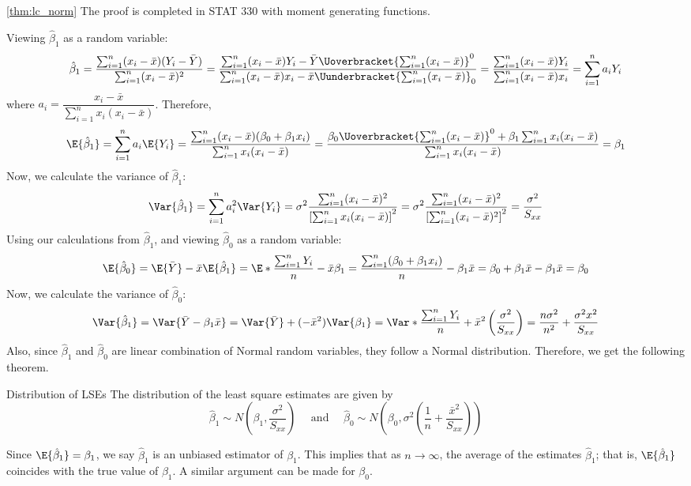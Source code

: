 \begin{Proof}{\ref{thm:lc_norm}}{}
    The proof is completed in STAT 330 with moment generating functions.
\end{Proof}
Viewing $ \hat{\beta}_1 $ as a random variable:
\[ \hat{\beta}_1=\frac{\sum_{i=1}^{n} (x_i-\bar{x})
        (Y_i-\bar{Y})}{
        \sum_{i=1}^{n} (x_i-\bar{x})^2
    }
    =
    \frac{\sum_{i=1}^{n} (x_i-\bar{x})Y_i-
        \bar{Y}\Uoverbracket{\sum_{i=1}^{n} (x_i-\bar{x})}^{0}}{
        \sum_{i=1}^{n} (x_i-\bar{x})x_i-\bar{x}
        \Uunderbracket{\sum_{i=1}^{n} (x_i-\bar{x})}_{0}
    }
    =
    \frac{\sum_{i=1}^{n} (x_i-\bar{x})Y_i}{
        \sum_{i=1}^{n} (x_i-\bar{x})x_i
    }=\sum_{i=1}^{n} a_i Y_i  \]
where $ a_i=\dfrac{x_i-\bar{x}}{\sum_{i=1}^{n} x_i(x_i-\bar{x})}  $.
Therefore,
\[
    \E{\hat{\beta}_1}
    = \sum_{i=1}^{n} a_i\E{Y_i}
    =\frac{\sum_{i=1}^{n}(x_i-\bar{x})(\beta_0+\beta_1x_i)}{
        \sum_{i=1}^{n} x_i(x_i-\bar{x})
    }
    =\frac{\beta_0 \Uoverbracket{\sum_{i=1}^{n}(x_i-\bar{x})}^{0}+
        \beta_1\sum_{i=1}^{n} x_i(x_i-\bar{x})}{
        \sum_{i=1}^{n} x_i(x_i-\bar{x})
    }
    =
    \beta_1
\]
Now, we calculate the variance of $ \hat{\beta}_1 $:
\[
    \Var{\hat{\beta}_1}
    =\sum_{i=1}^{n} a_i^2\Var{Y_i}
    =\sigma^2
    \frac{\sum_{i=1}^{n} (x_i-\bar{x})^2}{
        \left[ \sum_{i=1}^{n} x_i(x_i-\bar{x}) \right]^2
    }
    =\sigma^2 \frac{\sum_{i=1}^{n} (x_i-\bar{x})^2}{
        \left[ \sum_{i=1}^{n} (x_i-\bar{x})^2 \right]^2
    }
    =\frac{\sigma^2}{S_{xx}}
\]
Using our calculations from $ \hat{\beta}_1 $,
and viewing $ \hat{\beta}_0 $ as a random variable:
\[ \E{\hat{\beta}_0}=
    \E{\bar{Y}}-\bar{x}\E{\hat{\beta}_1}=
    \E*{\frac{\sum_{i=1}^{n}Y_i}{n}}-\bar{x}\beta_1=
    \frac{\sum_{i=1}^{n}(\beta_0+\beta_1x_i)}{n}-
    \beta_1\bar{x}=\beta_0+\beta_1\bar{x}-\beta_1\bar{x}=\beta_0
\]
Now, we calculate the variance of $ \hat{\beta}_0 $:
\[
    \Var{\hat{\beta}_1}
    =\Var{\bar{Y}-\beta_1\bar{x}}
    =\Var{\bar{Y}}+(-\bar{x}^2)\Var{\beta_1}
    =\Var*{\frac{\sum_{i=1}^{n} Y_i}{n}}+\bar{x}^2\left( \frac{\sigma^2}{S_{xx}} \right)
    =\frac{n\sigma^2}{n^2}+\frac{\sigma^2 x^2}{S_{xx}}
\]
Also, since $ \hat{\beta}_1 $ and $ \hat{\beta}_0 $
are linear combination of Normal random variables,
they follow a Normal distribution. Therefore, we get the following theorem.
\begin{Theorem}{Distribution of LSEs}{}
    The distribution of the least square estimates are given by
    \[ \hat{\beta}_1\sim
        N\left( \beta_1,\frac{\sigma^2}{S_{xx}}  \right)\quad\text{ and }\quad
        \hat{\beta}_0
        \sim N\left( \beta_0,\sigma^2
        \left(\frac{1}{n}+\frac{\bar{x}^2}{S_{xx}}\right)  \right) \]
\end{Theorem}
Since $ \E{\hat{\beta}_1}=\beta_1 $,
we say $ \hat{\beta}_1 $ is an unbiased
estimator of $ \beta_1 $. This implies
that as $ n\to\infty $, the average
of the estimates $ \hat{\beta}_1 $; that is,
$ \E{\hat{\beta}_1} $ coincides with the true
value of $ \beta_1 $. A similar argument can be made for $ \beta_0 $.

